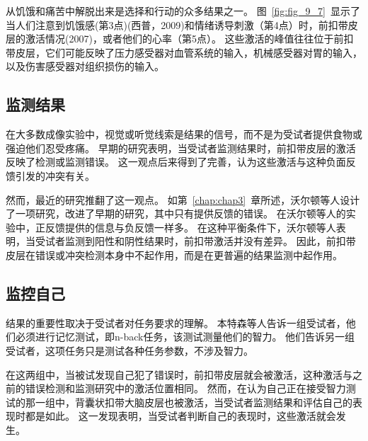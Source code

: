 从饥饿和痛苦中解脱出来是选择和行动的众多结果之一。
图~\ref{fig:fig_9_7}~显示了当人们注意到饥饿感(第3点)(西普，2009)和情绪诱导刺激（第4点）\cite{siep2009hunger}时，前扣带皮层的激活情况(2007)，或者他们的心率（第5点）\cite{critchley2004neural}。
这些激活的峰值往往位于前扣带皮层，它们可能反映了压力感受器对血管系统的输入，机械感受器对胃的输入，以及伤害感受器对组织损伤的输入\cite{ba2009architecture}。
\par



\subsection{监测结果}
\par
在大多数成像实验中，视觉或听觉线索是结果的信号，而不是为受试者提供食物或强迫他们忍受疼痛。
早期的研究表明，当受试者监测结果时，前扣带皮层的激活反映了检测或监测错误\cite{carter1998anterior}。
这一观点后来得到了完善，认为这些激活与这种负面反馈引发的冲突有关\cite{botvinick2001conflict}。
\par


然而，最近的研究推翻了这一观点。
如第~\ref{chap:chap3}~章所述，沃尔顿等人\cite{walton2004interactions}设计了一项研究，改进了早期的研究，其中只有提供反馈的错误。
在沃尔顿等人的实验中，正反馈提供的信息与负反馈一样多。
在这种平衡条件下，沃尔顿等人表明，当受试者监测到阳性和阴性结果时，前扣带激活并没有差异。
因此，前扣带皮层在错误或冲突检测本身中不起作用，而是在更普遍的结果监测中起作用。
\par



\subsection{监控自己}
\par
结果的重要性取决于受试者对任务要求的理解。
本特森等人\cite{bengtsson2009motivation}告诉一组受试者，他们必须进行记忆测试，即n-back任务，该测试测量他们的智力。
他们告诉另一组受试者，这项任务只是测试各种任务参数，不涉及智力。
\par


在这两组中，当被试发现自己犯了错误时，前扣带皮层就会被激活，这种激活与之前的错误检测和监测研究中的激活位置相同\cite{botvinick2004conflict}。
然而，在认为自己正在接受智力测试的那一组中，背囊状扣带大脑皮层也被激活，当受试者监测结果和评估自己的表现时都是如此。
这一发现表明，当受试者判断自己的表现时，这些激活就会发生。
\par



